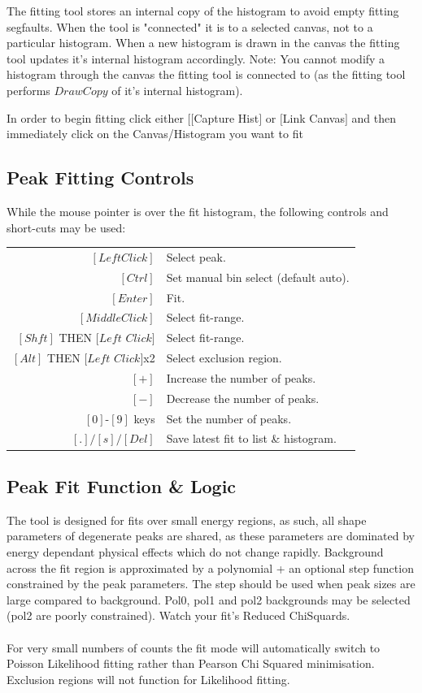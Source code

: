 \documentclass[a4paper,10pt]{article}
\begin{document}
The fitting tool stores an internal copy of the histogram to avoid empty fitting segfaults. When the tool is "connected" it is to a selected canvas, not to a particular histogram. When a new histogram is drawn in the canvas the fitting tool updates it's internal histogram accordingly. Note: You cannot modify a histogram through the canvas the fitting tool is connected to (as the fitting tool performs $DrawCopy$ of it's internal histogram).

In order to begin fitting click either [$[$Capture Hist$]$ or $[$Link Canvas$]$ and then immediately click on the Canvas/Histogram you want to fit

\subsection{Peak Fitting Controls}
While the mouse pointer is over the fit histogram, the following controls and short-cuts may be used:
\begin{center}
\begin{tabular}{ r l }
$[Left Click]$ & Select peak.\\
$[Ctrl]$ & Set manual bin select (default auto).\\
$[Enter]$ & Fit.\\
$[Middle Click]$ & Select fit-range.\\
$[Shft]$ THEN $[Left$ $Click]$ & Select fit-range.\\
$[Alt]$ THEN $[Left$ $Click]$x2 & Select exclusion region.\\
$[+]$ & Increase the number of peaks.\\
$[-]$ & Decrease the number of peaks.\\
$[0]$-$[9]$ keys & Set the number of peaks.\\
$[.]/[s]/[Del]$ & Save latest fit to list \& histogram.\\
\end{tabular}
\end{center}
  	
\subsection{Peak Fit Function \& Logic}
The tool is designed for fits over small energy regions, as such, all shape parameters of degenerate peaks are shared, as these parameters are dominated by energy dependant physical effects which do not change rapidly. Background across the fit region is approximated by a polynomial + an optional step function constrained by the peak parameters. The step should be used when peak sizes are large compared to background. Pol0, pol1 and pol2 backgrounds may be selected (pol2 are poorly constrained). Watch your fit's Reduced ChiSquards.
\\
\\
For very small numbers of counts the fit mode will automatically switch to Poisson Likelihood fitting rather than Pearson Chi Squared minimisation. Exclusion regions will not function for Likelihood fitting.
\end{document}
